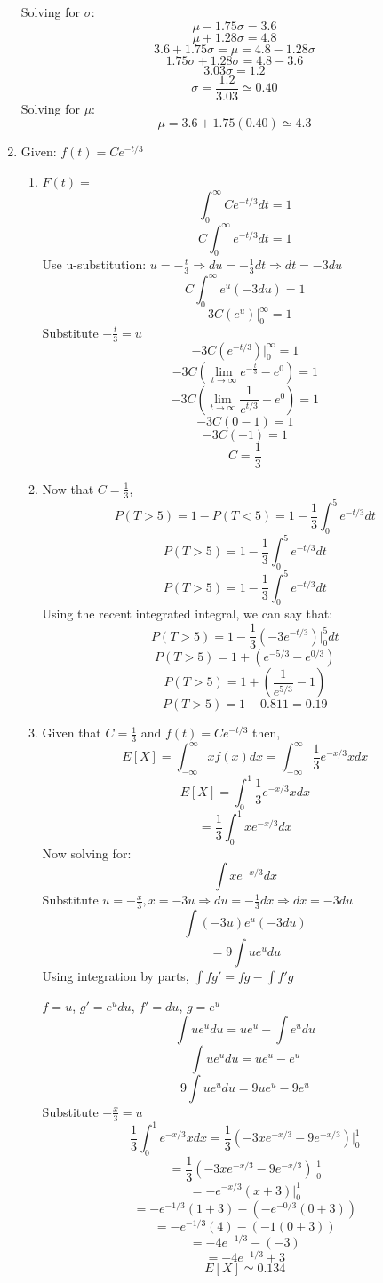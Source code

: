 \documentclass[12pt]{article}
\begin{document}
\begin{enumerate}
		Solving for $\sigma$:
			$$\mu -1.75\sigma = 3.6$$
			$$\mu + 1.28\sigma = 4.8$$
			$$3.6 + 1.75 \sigma = \mu = 4.8 - 1.28 \sigma$$
			$$1.75 \sigma + 1.28 \sigma = 4.8 - 3.6$$
			$$3.03\sigma = 1.2$$
			$$\sigma = \frac{1.2}{3.03} \simeq 0.40$$
		Solving for $\mu$:
			$$\mu = 3.6 + 1.75(0.40)  \simeq 4.3$$
	\item Given: $f(t) = Ce^{-t/3}$
		\begin{enumerate}
			\item $F(t) = $
			 	$$\int_{0}^{\infty} Ce^{-t/3}dt = 1$$
				$$C\int_{0}^{\infty} e^{-t/3}dt = 1$$
				Use u-substitution: $u = -\frac{t}{3} \Rightarrow du = -\frac{1}{3}dt \Rightarrow dt = -3du$
				$$C\int_{0}^{\infty} e^{u}(-3 du) = 1$$
				$$-3C(e^{u})\vert_{0}^{\infty} = 1$$
				Substitute $-\frac{t}{3} = u$
				$$-3C(e^{-t/3})\vert_{0}^{\infty} = 1$$
				$$-3C(\lim\limits_{t \to \infty} e^{-\frac{t}{3}} -  e^{0}) = 1$$
				$$-3C(\lim\limits_{t \to \infty} \frac{1}{e^{t/3}} -  e^0) = 1$$
				$$-3C(0 - 1) = 1$$
				$$-3C(-1) = 1$$
				$$C = \frac{1}{3}$$
			\item Now that $C = \frac{1}{3}$,
				$$P(T > 5) = 1 - P(T < 5) = 1 - \frac{1}{3} \int_{0}^{5} e^{-t/3}dt$$
				$$P(T > 5) = 1 - \frac{1}{3} \int_{0}^{5} e^{-t/3}dt$$
				$$P(T > 5) = 1 - \frac{1}{3} \int_{0}^{5} e^{-t/3}dt$$
				Using the recent integrated integral, we can say that:
				$$P(T > 5) = 1 - \frac{1}{3} (-3e^{-t/3})\vert_{0}^{5}dt$$
				$$P(T > 5) = 1 + (e^{-5/3} - e^{0/3})$$
				$$P(T > 5) = 1 + (\frac{1}{e^{5/3}} - 1)$$
				$$P(T > 5) = 1 - 0.811 = 0.19$$
			\item Given that $C = \frac{1}{3}$ and $f(t) = Ce^{-t/3}$ then, 
			$$E[X] = \int_{-\infty}^{\infty} xf(x)dx = \int_{-\infty}^{\infty} \frac{1}{3}e^{-x/3}xdx$$
			$$E[X] = \int_{0}^{1} \frac{1}{3}e^{-x/3}xdx$$
			$$= \frac{1}{3}\int_{0}^{1} xe^{-x/3}dx$$
			Now solving for:
			$$\int xe^{-x/3}dx$$
			Substitute $u = -\frac{x}{3}, x = -3u \Rightarrow du = -\frac{1}{3}dx \Rightarrow dx = -3du$
			$$\int (-3u)e^{u}(-3du)$$
			$$= 9\int ue^{u}du$$ 
			Using integration by parts, $\int fg' = fg - \int f'g$
			
			$f = u$, $g' = e^u du$, $f' = du$, $g = e^u$
			$$\int ue^{u}du = ue^u - \int e^u du$$
			$$\int ue^{u}du = ue^u - e^u$$
			$$9 \int ue^{u}du = 9ue^u - 9e^u$$
			Substitute $-\frac{x}{3} = u$
			$$\frac{1}{3}\int_{0}^{1} e^{-x/3}xdx = \frac{1}{3} (-3xe^{-x/3} - 9e^{-x/3})\vert_{0}^{1}$$
			$$= \frac{1}{3}(-3xe^{-x/3} - 9e^{-x/3})\vert_{0}^{1}$$
			$$= -e^{-x/3}(x + 3)\vert_{0}^{1}$$
			$$= -e^{-1/3}(1 + 3) - (-e^{-0/3}(0 + 3))$$
			$$= -e^{-1/3}(4) - (-1(0 + 3))$$
			$$= -4e^{-1/3} - (-3)$$
			$$= -4e^{-1/3} + 3$$
			$$E[X] \simeq 0.134$$
		\end{enumerate}
		

\end{enumerate}
\end{document}
